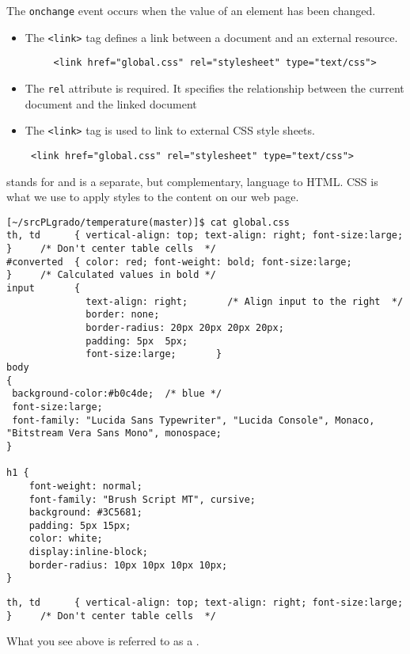 The \verb|onchange| event occurs when the value of an element has been changed.

\begin{itemize}
\item
The \verb|<link>| tag defines a link between a document and an external resource.
\begin{verbatim}
     <link href="global.css" rel="stylesheet" type="text/css">
\end{verbatim}
\item
The \verb|rel| attribute is required. It specifies the relationship between the current document and the linked document
\item
The \verb|<link>| tag is used to link to external CSS style sheets.
\begin{verbatim}
 <link href="global.css" rel="stylesheet" type="text/css">
\end{verbatim}
\end{itemize}


 stands for  and is a separate, but complementary, language to HTML. CSS is what we use to apply styles to the content on our web page.



    \begin{verbatim}
[~/srcPLgrado/temperature(master)]$ cat global.css 
th, td      { vertical-align: top; text-align: right; font-size:large; }     /* Don't center table cells  */
#converted  { color: red; font-weight: bold; font-size:large;          }     /* Calculated values in bold */
input       { 
              text-align: right;       /* Align input to the right  */
              border: none; 
              border-radius: 20px 20px 20px 20px;
              padding: 5px  5px;
              font-size:large;       }
body
{
 background-color:#b0c4de;  /* blue */
 font-size:large;
 font-family: "Lucida Sans Typewriter", "Lucida Console", Monaco, "Bitstream Vera Sans Mono", monospace;
}

h1 {
    font-weight: normal;
    font-family: "Brush Script MT", cursive;
    background: #3C5681;
    padding: 5px 15px;
    color: white;
    display:inline-block;
    border-radius: 10px 10px 10px 10px;
}
    \end{verbatim}
  

\begin{verbatim}
th, td      { vertical-align: top; text-align: right; font-size:large; }     /* Don't center table cells  */
\end{verbatim}
What you see above is referred to as a . 

